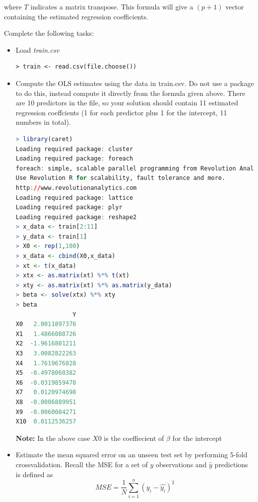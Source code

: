 \documentclass[fontsize=10pt,DIV=14]{scrartcl}
\begin{document}
\begin{enumerate}
		where $T$ indicates a matrix transpose. This formula will give a $(p + 1)$ vector containing the estimated regression coeﬃcients.

		Complete the following tasks:
		\begin{itemize}
			\item
			Load \emph{train.csv}

\begin{verbatim}
> train <- read.csv(file.choose())
\end{verbatim}
			
			\item
			Compute the OLS estimates using the data in train.csv. Do not use a package to do this, instead compute it directly from the formula given above. There are 10 predictors in the ﬁle, so your solution should contain 11 estimated regression coeffcients (1 for each predictor plus 1 for the intercept, 11 numbers in total).

			\begin{lstlisting}[language=R,frame=single]
> library(caret)
Loading required package: cluster
Loading required package: foreach
foreach: simple, scalable parallel programming from Revolution Analytics
Use Revolution R for scalability, fault tolerance and more.
http://www.revolutionanalytics.com
Loading required package: lattice
Loading required package: plyr
Loading required package: reshape2
> x_data <- train[2:11]
> y_data <- train[1]
> X0 <- rep(1,100)
> x_data <- cbind(X0,x_data)
> xt <- t(x_data)
> xtx <- as.matrix(xt) %*% t(xt)
> xty <- as.matrix(xt) %*% as.matrix(y_data)
> beta <- solve(xtx) %*% xty
> beta
                Y
X0   2.0011897376
X1   1.4866088726
X2  -1.9616801211
X3   3.0082822263
X4   1.7619676828
X5  -0.4978060382
X6  -0.0319859478
X7   0.0120974698
X8  -0.0006889951
X9  -0.0060084271
X10  0.0112536257
			\end{lstlisting}
			\textbf{Note:} In the above case $X0$ is the coeffiecient of $\beta$ for the intercept
			\item
			Estimate the mean squared error on an unseen test set by performing 5-fold crossvalidation. Recall the MSE for a set of $y$ observations and $\hat{y}$ predictions is deﬁned as
			\begin{equation*}
				MSE = \frac{1}{N} \sum_{i=1}^{n} (y_{i} - \hat{y_{i}})^{2}
			\end{equation*}


\end{itemize}
\end{enumerate}
\end{document}

